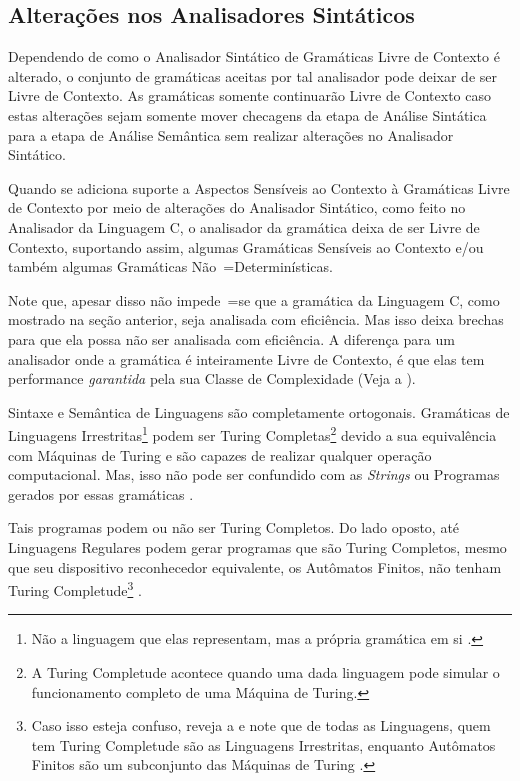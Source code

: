 \subsection{Alterações nos Analisadores Sintáticos}
\label{alteracoesNosAnalisadoresSintaticos}

Dependendo de como o Analisador Sintático de Gramáticas Livre de Contexto é alterado,
o conjunto de gramáticas aceitas por tal analisador pode deixar de ser Livre de Contexto.
As gramáticas somente continuarão Livre de Contexto caso estas alterações sejam somente mover checagens da etapa de Análise Sintática para a etapa de Análise Semântica sem realizar alterações no Analisador Sintático.

Quando se adiciona suporte a Aspectos Sensíveis ao Contexto \cite{contextSensitiveParsing} à Gramáticas Livre de Contexto por meio de alterações do Analisador Sintático,
como feito no Analisador da Linguagem C,
o analisador da gramática deixa de ser Livre de Contexto,
suportando assim,
algumas Gramáticas Sensíveis ao Contexto e\slash{}ou também algumas Gramáticas Não~=Determinísticas.

Note que,
apesar disso não impede~=se que a gramática da Linguagem C,
como mostrado na seção anterior,
seja analisada com eficiência.
Mas isso deixa brechas para que ela possa não ser analisada com eficiência.
A diferença para um analisador onde a gramática é inteiramente Livre de Contexto,
é que elas tem performance \textit{garantida} pela sua Classe de Complexidade (Veja a ).

Sintaxe e
Semântica de Linguagens são completamente ortogonais.
Gramáticas de Linguagens Irrestritas\footnote{
Não a linguagem que elas representam,
mas a própria gramática em si \cite{finiteAutomataTuringComplete}.
}
podem ser Turing Completas\footnote{
A Turing Completude acontece quando uma dada linguagem pode simular o funcionamento completo de uma Máquina de Turing.
}
devido a sua equivalência com Máquinas de Turing e
são capazes de realizar qualquer operação computacional.
Mas,
isso não pode ser confundido com as \textit{Strings} ou
Programas gerados por essas gramáticas \cite{areThereDomainSpecificLanguages,yamlSpecificModelChecking}.

Tais programas podem ou
não ser Turing Completos.
Do lado oposto,
até Linguagens Regulares podem gerar programas que são Turing Completos,
mesmo que seu dispositivo reconhecedor equivalente,
os Autômatos Finitos,
não tenham Turing Completude\footnote{
Caso isso esteja confuso,
reveja a  e
note que de todas as Linguagens,
quem tem Turing Completude são as Linguagens Irrestritas,
enquanto Autômatos Finitos são um subconjunto das Máquinas de Turing \cite{finiteAutomataTuringComplete}.
}
\cite{turingCompleteRegularLanguages,finiteAutomataTuringComplete}.



